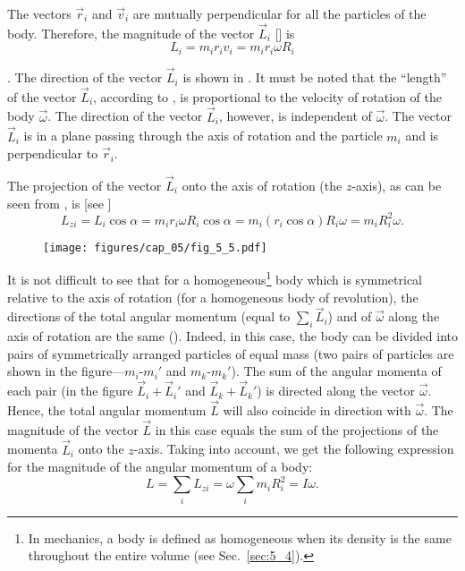 \noindent
The vectors $\vec{r}_i$ and $\vec{v}_i$ are mutually perpendicular for all the particles of the body. Therefore, the magnitude of the vector $\vec{L}_i$ [] is
\begin{equation}\label{eq:5_8}
L_i = m_i r_i v_i = m_i r_i \omega R_i
\end{equation}

. The direction of the vector $\vec{L}_i$ is shown in . It must be noted that the ``length'' of the vector $\vec{L}_i$, according to , is proportional to the velocity of rotation of the body $\vec{\omega}$. The direction of the vector $\vec{L}_i$, however, is independent of $\vec{\omega}$. The vector $\vec{L}_i$ is in a plane passing through the axis of rotation and the particle $m_i$ and is perpendicular to $\vec{r}_i$.

The projection of the vector $\vec{L}_i$ onto the axis of rotation (the $z$-axis), as can be seen from , is [see ]
\begin{equation}\label{eq:5_9}
L_{zi} = L_i\cos\alpha = m_i r_i \omega R_i \cos\alpha = m_i(r_i\cos\alpha)R_i\omega = m_iR_i^2\omega.
\end{equation}

\begin{figure}[t]
	\begin{center}
		\texttt{[image: figures/cap\_05/fig\_5\_5.pdf]}
		\caption[]{}
		\label{fig:5_5}
	\end{center}
\vspace{-1.0cm}
\end{figure}

It is not difficult to see that for a homogeneous\footnote{In mechanics, a body is defined as homogeneous when its density is the same throughout the entire volume (see Sec.~\ref{sec:5_4}).} body which is symmetrical relative to the axis of rotation (for a homogeneous body of revolution), the directions of the total angular momentum (equal to $\sum_i\vec{L}_i$) and of $\vec{\omega}$ along the axis of rotation are the same (). Indeed, in this case, the body can be divided into pairs of symmetrically arranged particles of equal mass (two pairs of particles are shown in the figure---$m_i$-$m_i'$ and $m_k$-$m_k'$). The sum of the angular momenta of each pair (in the figure $\vec{L}_i+\vec{L}_i'$ and $\vec{L}_k+\vec{L}_k'$) is directed along the vector $\vec{\omega}$. Hence, the total angular momentum $\vec{L}$ will also coincide in direction with $\vec{\omega}$. The magnitude of the vector $\vec{L}$ in this case equals the sum of the projections of the momenta $\vec{L}_i$ onto the $z$-axis. Taking  into account, we get the following expression for the magnitude of the angular momentum of a body:
\begin{equation}\label{eq:5_10}
L = \sum_i L_{zi} = \omega \sum_i m_i R_i^2 = I \omega.
\end{equation}

